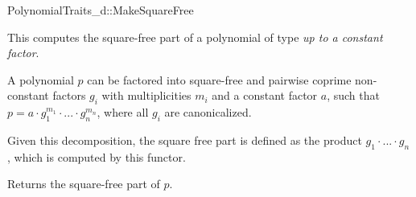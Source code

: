 \begin{ccRefConcept}{PolynomialTraits_d::MakeSquareFree}
\ccDefinition

This  computes the square-free part of 
a polynomial of type   
{\em up to a constant factor}.  

A polynomial $p$ can be  factored into square-free and pairwise coprime 
non-constant factors $g_i$ with multiplicities $m_i$ and a constant factor $a$, 
such that $p = a  \cdot  g_1^{m_1}  \cdot  ...  \cdot  g_n^{m_n}$, where all $g_i$ are canonicalized.

Given this decomposition, the square free part is defined as the product $g_1  \cdot  ...  \cdot  g_n$, 
which is computed by this functor. 

\ccRefines 
{}

\ccTypes

\ccGlue
{}

\ccOperations
{}
         { Returns the square-free part of $p$.}



\ccSeeAlso

\\
\\
\\
\\
\\

\end{ccRefConcept}
